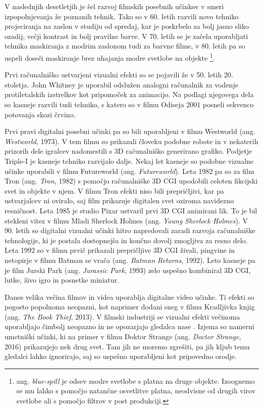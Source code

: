 \documentclass[a4paper, 12pt]{book}
\begin{document}
V naslednjih desetletjih je šel razvoj filmskih posebnih učinkov v smeri izpopolnjevanja že poznanih tehnik. 
Tako so v 60. letih razvili novo tehniko projeciranja na zaslon v studiju od spredaj, kar je poskrbelo za bolj jasno sliko ozadij, večji kontrast in bolj pravilne barve. 
V 70. letih se je začela uporabljati tehnika maskiranja z modrim zaslonom tudi za barvne filme, v 80. letih pa so uspeli doseči maskiranje brez uhajanja modre svetlobe na objekte
\footnote{ang. {\it blue-spill} je odsev modre svetlobe s platna na druge objekte. 
Izoognemo se mu lahko s pomočjo natančne osvetlitve platna, neodvisne od drugih virov svetlobe ali s pomočjo filtrov v post produkciji.}.

Prvi računalniško ustvarjeni vizualni efekti so se pojavili že v 50. letih 20. stoletja. 
John Whitney je uporabil odslužen analogni računalnik za vodenje protiletalskih izstrelkov kot pripomoček za animacijo. 
Na podlagi njegovega dela so kasneje razvili tudi tehniko, s katero so v filmu Odiseja 2001 posneli sekvenco potovanja skozi črvino.

Prvi pravi digitalni posebni učinki pa so bili uporabljeni v filmu Westworld (ang. {\it Westworld}, 1973).
V tem filmu so prikazali človeku podobne robote in v nekaterih prizorih dele igralcev nadomestili s 3D računalniško generirano grafiko. 
Podjetje Triple-I je kasneje tehniko razvijalo dalje.
Nekaj let kasneje so podobne vizualne učinke uporabili v filmu Futureworld (ang. {\it Futureworld}).
Leta 1982 pa so za film Tron (ang. {\it Tron}, 1982) s pomočjo računalniške 3D CGI upodobili celoten fikcijski svet in objekte v njem.
V filmu Tron efekti niso bili prepričljivi, kar pa ustvarjalcev ni oviralo, saj film prikazuje digitalen svet oziroma navidezno resničnost.
Leta 1985 je studio Pixar ustvaril prvi 3D CGI animirani lik.
To je bil stekleni vitez v filmu Mladi Sherlock Holmes (ang. {\it Young Sherlock Holmes}).
V 90. letih so digitalni vizualni učinki hitro napredovali zaradi razvoja računalniške tehnologije, ki je postala dostopnejša in končno dovolj zmogljiva za resno delo.
Leta 1992 so v filmu prvič prikazali prepričljive 3D CGI živali, pingvine in netopirje v filmu Batman se vrača (ang. {\it Batman Returns}, 1992).
Leto kasneje pa je film Jurski Park (ang. {\it Jurassic Park}, 1993) zelo uspešno kombiniral 3D CGI, lutke, živo igro in posnetke miniatur. 

Danes velika večina filmov in videa uporablja digitalne video učinke. 
Ti efekti so pogosto popolnoma neopazni, kot naprimer dodani sneg v filmu Kradljivka knjig (ang. {\it The Book Thief}, 2013).
V filmski industriji se vizualni efekti večinoma uporabljajo čimbolj neopazno in ne opozarjajo gledalca nase \cite{vesHandbook}.
Izjema so namerni umetniški učinki, ki na primer v filmu Doktor Strange (ang. {\it Doctor Strange}, 2016) prikazujejo nek drug svet. 
Tam jih ne moremo zgrešiti, pa jih kljub temu gledalci lahko ignorirajo, saj so uspešno uporabljeni kot pripovedno orodje.
\end{document}
